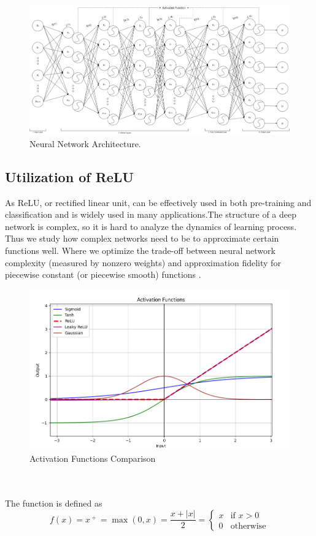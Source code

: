 \documentclass[conference]{IEEEtran}
\begin{document}
\begin{figure}[h]
    \centering
    \includegraphics[width=\linewidth]{AI Architecture.drawio.png}
    \caption{Neural Network Architecture.}
    \label{fig}
\end{figure}

\subsection{Utilization of ReLU}
As ReLU, or rectified linear unit, can be effectively used in both pre-training and classification and is widely used in many applications.The structure of a deep network is complex, so it is hard to analyze the dynamics of learning process. Thus we study how complex networks need to be to approximate certain functions well. Where we optimize the trade-off between neural network complexity (measured by nonzero weights) and approximation fidelity for piecewise constant (or piecewise smooth) functions \cite{b1}.
\begin{figure}[h]
    \centering
    \includegraphics[width=\linewidth]{Activation Functions Compare.PNG}
    \caption{Activation Functions Comparison}
    \label{fig}
\end{figure}
\\
\\
The function is defined as
\[f(x) = x^{\ +\ } = \max(0,x) = \frac{x+|x|}{2} = \begin{cases}
x & \text{if } x > 0\\
0 & \text{otherwise}
\end{cases}
\]
\end{document}
